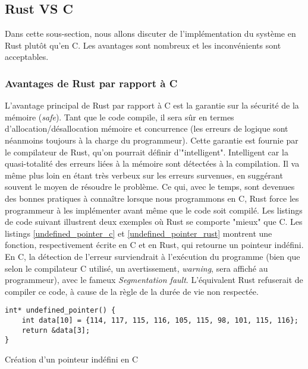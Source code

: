 \subsection{Rust VS C}
Dans cette sous-section, nous allons discuter de l'implémentation du système en Rust plutôt qu'en 
C. Les avantages sont nombreux et les inconvénients sont acceptables.

\subsubsection{Avantages de Rust par rapport à C}
L'avantage principal de Rust par rapport à C est la garantie sur la sécurité de la mémoire (\textit{safe}). 
Tant que le code compile, il sera sûr en termes d'allocation/désallocation mémoire et concurrence 
(les erreurs de logique sont néanmoins toujours à la charge du programmeur). Cette garantie est 
fournie par le compilateur de Rust, qu'on pourrait définir d'"intelligent". Intelligent car la 
quasi-totalité des erreurs liées à la mémoire sont détectées à la compilation. Il va même plus 
loin en étant très verbeux sur les erreurs survenues, en suggérant souvent le moyen de résoudre 
le problème. Ce qui, avec le temps, sont devenues des bonnes pratiques à connaître lorsque 
nous programmons en C, Rust force les programmeur à les implémenter avant même que le code soit 
compilé. Les listings de code suivant illustrent deux exemples où Rust se comporte "mieux" que 
C. Les listings \ref{undefined_pointer_c} et \ref{undefined_pointer_rust} montrent une fonction, 
respectivement écrite en C et en Rust, qui retourne un pointeur indéfini. En C, la détection de 
l'erreur surviendrait à l'exécution du programme (bien que selon le compilateur C utilisé, un 
avertissement, \textit{warning}, sera affiché au programmeur), avec le fameux \textit{Segmentation fault}.
L'équivalent Rust refuserait de compiler ce code, à cause de la règle de la durée de vie non respectée.
\bigbreak
\begin{code}
    \begin{verbatim}
int* undefined_pointer() {
    int data[10] = {114, 117, 115, 116, 105, 115, 98, 101, 115, 116};
    return &data[3];
}
    \end{verbatim}
    \caption{Création d'un pointeur indéfini en C}
    \label{undefined_pointer_c}
\end{code}
